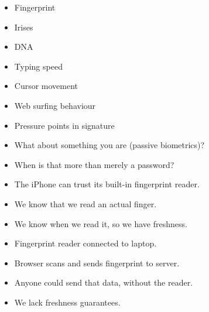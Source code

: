 \begin{frame}
  \begin{example}
    \begin{itemize}
      \item Fingerprint
      \item Irises
      \item DNA
    \end{itemize}
  \end{example}

  \pause{}

  \begin{example}
    \begin{itemize}
      \item Typing speed
      \item Cursor movement
      \item Web surfing behaviour
      \item Pressure points in signature
    \end{itemize}
  \end{example}
\end{frame}

\begin{frame}
  \begin{exercise}
    \begin{itemize}
      \item What about something you are (passive biometrics)?
      \item When is that more than merely a password?
    \end{itemize}
  \end{exercise}
\end{frame}

\begin{frame}
  \begin{example}
    \begin{itemize}
      \item The iPhone can trust its built-in fingerprint reader.
      \item We know that we read an actual finger.
      \item We know when we read it, so we have freshness.
    \end{itemize}
  \end{example}

  \pause{}

  \begin{example}
    \begin{itemize}
      \item Fingerprint reader connected to laptop.
      \item Browser scans and sends fingerprint to server.
      \item Anyone could send that data, without the reader.
      \item We lack freshness guarantees.
    \end{itemize}
  \end{example}
\end{frame}

